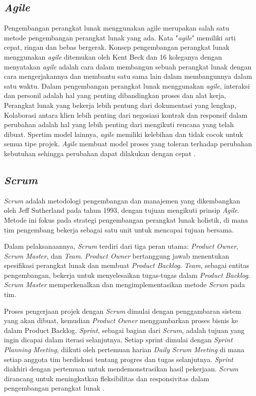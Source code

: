 \documentclass[
	a4paper, %
	10pt, %
	unnumberedsections, %
	twoside, %
]{LTJournalArticle}
\begin{document}
\subsection{\textit{Agile}}
Pengembangan perangkat lunak menggunakan agile merupakan salah satu metode pengembangan perangkat lunak yang ada. Kata "\textit{agile}" memiliki arti cepat, ringan dan bebas bergerak. Konsep pengembangan perangkat lunak menggunakan \textit{agile} ditemukan oleh Kent Beck dan 16 koleganya dengan menyatakan \textit{agile} adalah cara dalam membangun sebuah perangkat lunak dengan cara mengerjakannya dan membantu satu sama lain dalam membangunnya dalam satu waktu. Dalam pengembangan perangkat lunak menggunakan \textit{agile}, interaksi dan personil adalah hal yang penting dibandingkan proses dan alat kerja, Perangkat lunak yang bekerja lebih pentung dari dokumentasi yang lengkap, Kolaborasi antara klien lebih penting dari negosiasi kontrak dan responsif dalam perubahan adalah hal yang lebih penting dari mengikuti rencana yang telah dibuat. Spertim model lainnya, \textit{agile} memiliki kelebihan dan tidak cocok untuk semua tipe projek. \textit{Agile} membuat model proses yang toleran terhadap perubahan kebutuhan sehingga perubahan dapat dilakukan dengan cepat \cite{scrum}.

\subsection{\textit{Scrum}}

\textit{Scrum} adalah metodologi pengembangan dan manajemen yang dikembangkan oleh Jeff Sutherland pada tahun 1993, dengan tujuan mengikuti prinsip \textit{Agile}. Metode ini fokus pada strategi pengembangan perangkat lunak holistik, di mana tim pengembang bekerja sebagai satu unit untuk mencapai tujuan bersama.

Dalam pelaksanaannya, \textit{Scrum} terdiri dari tiga peran utama: \textit{Product Owner}, \textit{Scrum Master}, dan \textit{Team}. \textit{Product Owner} bertanggung jawab menentukan spesifikasi perangkat lunak dan membuat \textit{Product Backlog}. \textit{Team}, sebagai entitas pengembangan, bekerja untuk menyelesaikan tugas-tugas dalam \textit{Product Backlog}. \textit{Scrum Master} memperkenalkan dan mengimplementasikan metode \textit{Scrum} pada tim.

Proses pengerjaan projek dengan \textit{Scrum} dimulai dengan penggambaran sistem yang akan dibuat, kemudian \textit{Product Owner} menggambarkan proses bisnis ke dalam Product Backlog. \textit{Sprint}, sebagai bagian dari \textit{Scrum}, adalah tujuan yang ingin dicapai dalam iterasi selanjutnya. Setiap sprint dimulai dengan \textit{Sprint Planning Meeting}, diikuti oleh pertemuan harian \textit{Daily Scrum Meeting} di mana setiap anggota tim berdiskusi tentang progres dan tugas selanjutnya. \textit{Sprint} diakhiri dengan pertemuan untuk mendemonstrasikan hasil pekerjaan. \textit{Scrum} dirancang untuk meningkatkan fleksibilitas dan responsivitas dalam pengembangan perangkat lunak \cite{scrum}.
\end{document}
